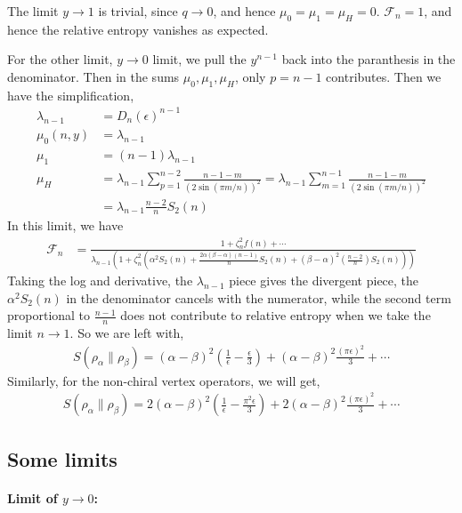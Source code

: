 \documentclass[11pt]{article}
\newcommand{\ep}{\epsilon}
\newcommand{\lb}{\left(}
\newcommand{\rb}{\right)}
\begin{document}
The limit $y\to 1$ is trivial, since $q \to 0$, and hence $\mu_0 = \mu_1 = \mu_H = 0$. $\mathcal{F}_n = 1$, and hence the relative entropy vanishes as expected. 

For the other limit, $y \to 0$ limit, we pull the $y^{n-1}$ back into the paranthesis in the denominator. Then in the sums $\mu_0,\mu_1,\mu_H$, only $p = n-1$ contributes. Then we have the simplification,
\begin{align}
    \lambda_{n-1}  &= D_n(\ep)^{n-1} \\
    \mu_0(n,y) &= \lambda_{n-1} \\
    \mu_1 & = (n-1)\lambda_{n-1}\\
    \mu_H &= \lambda_{n-1} \sum_{p=1}^{n-2} \frac{n-1-m}{(2\sin(\pi m /n))^2} = \lambda_{n-1} \sum_{m=1}^{n-1}\frac{n-1-m}{(2\sin(\pi m/n))^2} \\
    &= \lambda_{n-1} \frac{n-2}{n}S_2(n) 
\end{align}
In this limit, we have
\begin{align}
    \mathcal{F}_n &= \frac{1 + \zeta_n^2 f(n)+\cdots}{  \lambda_{n-1} \lb 1 + \zeta_n^2 \lb \alpha^2 S_2(n) + \frac{2\alpha (\beta - \alpha)(n-1)}{n}S_2(n) + (\beta-\alpha)^2  \lb\frac{n-2}{n}\rb S_2(n)\rb\rb } 
\end{align}
Taking the log and derivative, the $\lambda_{n-1}$ piece gives the divergent piece, the $\alpha^2S_2(n)$ in the denominator cancels with the numerator, while the second term proportional to $\frac{n-1}{n}$ does not contribute to relative entropy when we take the limit $n\to 1$. So we are left with,
\begin{align}
    S(\rho_\alpha \| \rho_\beta) = (\alpha - \beta)^2 \lb \frac{1}{\ep} - \frac{\ep}{3}\rb + (\alpha - \beta)^2 \frac{(\pi \ep)^2}{3}+\cdots
\end{align}
Similarly, for the non-chiral vertex operators, we will get,
\begin{align}
    S(\rho_\alpha \| \rho_\beta) = 2(\alpha - \beta)^2 \lb \frac{1}{\ep} - \frac{\pi^2\ep}{3}\rb + 2(\alpha - \beta)^2 \frac{(\pi \ep)^2}{3}+\cdots
\end{align}

\subsection{Some limits}

\paragraph{Limit of $y\to 0$:}
\end{document}
